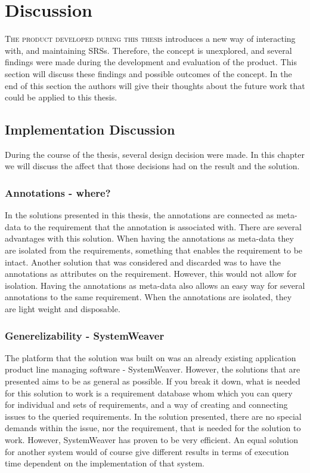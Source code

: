 \chapter{Discussion}
\lettrine[lines=4, loversize=-0.1, lraise=0.1]{T}{he product developed during this thesis} introduces a new way of interacting with, and maintaining SRSs. Therefore, the concept is unexplored, and several findings were made during the development and evaluation of the product. This section will discuss these findings and possible outcomes of the concept. In the end of this section the authors will give their thoughts about the future work that could be applied to this thesis. 

\section{Implementation Discussion}
During the course of the thesis, several design decision were made. In this chapter we will discuss the affect that those decisions had on the result and the solution.

\subsection{Annotations - where?}
In the solutions presented in this thesis, the annotations are connected as meta-data to the requirement that the annotation is associated with. There are several advantages with this solution. When having the annotations as meta-data they are isolated from the requirements, something that enables the requirement to be intact. Another solution that was considered and discarded was to have the annotations as attributes on the requirement. However, this would not allow for isolation. Having the annotations as meta-data also allows an easy way for several annotations to the same requirement. When the annotations are isolated, they are light weight and disposable.

\subsection{Generelizability - SystemWeaver}
The platform that the solution was built on was an already existing application product line managing software - SystemWeaver. However, the solutions that are presented aims to be as general as possible. If you break it down, what is needed for this solution to work is a requirement database whom which you can query for individual and sets of requirements, and a way of creating and connecting issues to the queried requirements. In the solution presented, there are no special demands within the issue, nor the requirement, that is needed for the solution to work. However, SystemWeaver has proven to be very efficient. An equal solution for another system would of course give different results in terms of execution time dependent on the implementation of that system. 

